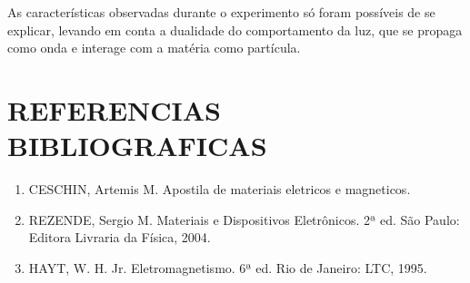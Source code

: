 \documentclass[10pt,twocolumn,letterpaper]{article}
\begin{document}
\hspace{1cm} As características observadas durante o experimento só foram possíveis de se explicar, levando em conta a dualidade do comportamento da luz, que se propaga como onda e interage com a matéria como partícula.


\section{REFERENCIAS BIBLIOGRAFICAS}

{\small
\begin{enumerate}

    \item CESCHIN, Artemis M. Apostila de materiais eletricos e magneticos.

    \item REZENDE, Sergio M. Materiais e Dispositivos Eletrônicos. 2ª ed. São Paulo: Editora Livraria da Física, 2004.

    \item HAYT, W. H. Jr. Eletromagnetismo. 6ª ed. Rio de Janeiro: LTC, 1995.
    
\end{enumerate}
}
\end{document}

